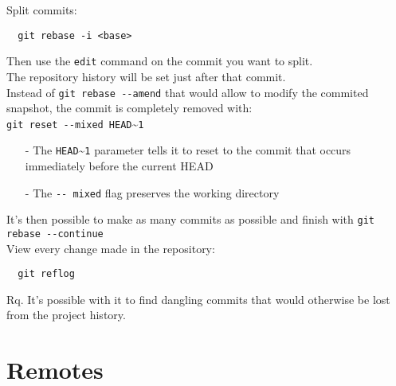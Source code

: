 \documentclass[french]{article}
\begin{document}
Split commits:
\begin{verbatim}
  git rebase -i <base>
\end{verbatim}
Then use the \verb|edit| command on the commit you want to split.\\
The repository history will be set just after that commit.\\
Instead of \verb|git rebase --amend| that would allow to modify the commited snapshot, the commit is completely removed with: \\ \verb|git reset --mixed HEAD|\textasciitilde \verb|1|
\begin{itemize}
  \item [-] The \verb|HEAD|\textasciitilde \verb|1| parameter tells it to reset to the commit that occurs immediately before the current HEAD
  \item [-] The \verb|-- mixed| flag preserves the working directory
\end{itemize}
It's then possible to make as many commits as possible and finish with \verb|git rebase --continue|\\

View every change made in the repository:
\begin{verbatim}
  git reflog
\end{verbatim}
Rq. It's possible with it to find dangling commits that would otherwise be lost from the project history.

\section{Remotes}
\end{document}
